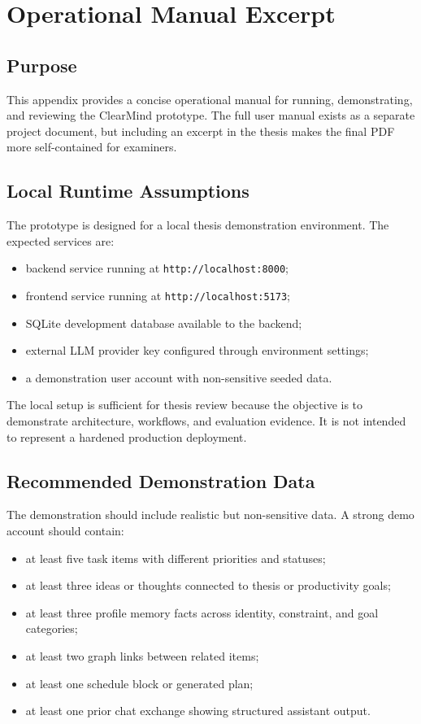 \chapter{Operational Manual Excerpt}

\section{Purpose}

This appendix provides a concise operational manual for running, demonstrating, and reviewing the ClearMind prototype. The full user manual exists as a separate project document, but including an excerpt in the thesis makes the final PDF more self-contained for examiners.

\section{Local Runtime Assumptions}

The prototype is designed for a local thesis demonstration environment. The expected services are:

\begin{itemize}
  \item backend service running at \texttt{http://localhost:8000};
  \item frontend service running at \texttt{http://localhost:5173};
  \item SQLite development database available to the backend;
  \item external LLM provider key configured through environment settings;
  \item a demonstration user account with non-sensitive seeded data.
\end{itemize}

The local setup is sufficient for thesis review because the objective is to demonstrate architecture, workflows, and evaluation evidence. It is not intended to represent a hardened production deployment.

\section{Recommended Demonstration Data}

The demonstration should include realistic but non-sensitive data. A strong demo account should contain:

\begin{itemize}
  \item at least five task items with different priorities and statuses;
  \item at least three ideas or thoughts connected to thesis or productivity goals;
  \item at least three profile memory facts across identity, constraint, and goal categories;
  \item at least two graph links between related items;
  \item at least one schedule block or generated plan;
  \item at least one prior chat exchange showing structured assistant output.
\end{itemize}

